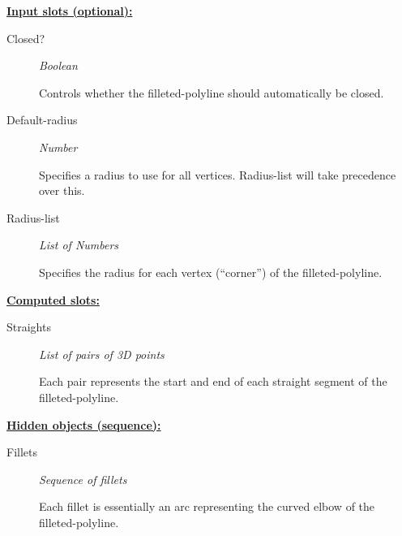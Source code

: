 \documentclass [11pt]{book}
\begin{document}
\begin{itemize}
\textbf{
\underline{Input slots (optional):}}

\begin{description}

\item [Closed?]
\emph{Boolean}

 Controls whether the filleted-polyline should automatically be closed.




\item [Default-radius]
\emph{Number}

 Specifies a radius to use for all vertices. Radius-list will take precedence over this.




\item [Radius-list]
\emph{List of Numbers}

 Specifies the radius for each vertex (``corner'') of the filleted-polyline.




\end{description}






\textbf{
\underline{Computed slots:}}

\begin{description}

\item [Straights]
\emph{List of pairs of 3D points}

 Each pair represents the start and end of each straight segment of the
filleted-polyline.




\end{description}






\textbf{
\underline{Hidden objects (sequence):}}

\begin{description}

\item [Fillets]
\emph{Sequence of fillets}

 Each fillet is essentially an arc representing the curved elbow
of the filleted-polyline.





\end{description}
\end{itemize}
\end{document}
